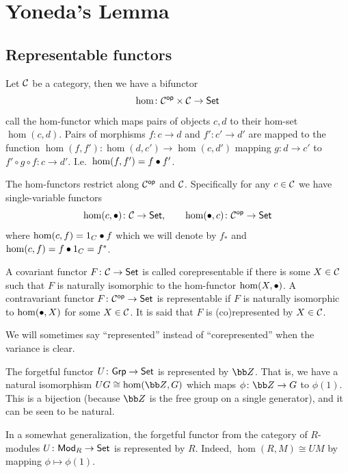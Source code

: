 \section{Yoneda's Lemma}

\subsection{Representable functors}

\bdefn

    Let ${{\cal C}}$ be a category, then we have a bifunctor
    $$ \hom\colon{{\cal C}}^{\sf op}\times{{\cal C}}\to{\sf Set} $$
    call the {\emphcolor hom-functor} which maps pairs of objects $c,d$ to their hom-set $\hom(c,d)$.
    Pairs of morphisms $f\colon c\to d$ and $f'\colon c'\to d'$ are mapped to the function $\hom(f,f')\colon\hom(d,c')\to\hom(c,d')$ mapping $g\colon d\to c'$ to $f'\circ g\circ f\colon c\to d'$.
    I.e.\ $\hom(f,f')=f\bullet f'$.

\edefn

The hom-functors restrict along ${{\cal C}}^{\sf op}$ and ${{\cal C}}$.
Specifically for any $c\in{{\cal C}}$ we have single-variable functors
$$ \hom(c,\bullet)\colon{{\cal C}}\to{\sf Set},\qquad \hom(\bullet,c)\colon{{\cal C}}^{\sf op}\to{\sf Set} $$
where $\hom(c,f)=1_C\bullet f$ which we will denote by $f_*$ and $\hom(c,f)=f\bullet1_C=f^*$.

\bdefn

    A covariant functor $F\colon{{\cal C}}\to{\sf Set}$ is called {\emphcolor corepresentable} if there is some $X\in{{\cal C}}$ such that $F$ is naturally isomorphic to the hom-functor $\hom(X,\bullet)$.
    A contravariant functor $F\colon{{\cal C}}^{\sf op}\to{\sf Set}$ is {\emphcolor representable} if $F$ is naturally isomorphic to $\hom(\bullet,X)$ for some $X\in{{\cal C}}$.
    It is said that $F$ is {\emphcolor (co)represented} by $X\in{{\cal C}}$.

\edefn

We will sometimes say ``represented'' instead of ``corepresented'' when the variance is clear.

\bexam

    \benum
        \item The forgetful functor $U\colon{\sf Grp}\to{\sf Set}$ is represented by $\bZ$.
        That is, we have a natural isomorphism $UG\cong\hom(\bZ,G)$ which maps $\phi\colon\bZ\to G$ to $\phi(1)$.
        This is a bijection (because $\bZ$ is the free group on a single generator), and it can be seen to be natural.

        \item In a somewhat generalization, the forgetful functor from the category of $R$-modules $U\colon{\sf Mod}_R\to{\sf Set}$ is represented by $R$.
        Indeed, $\hom(R,M)\cong UM$ by mapping $\phi\mapsto\phi(1)$.

